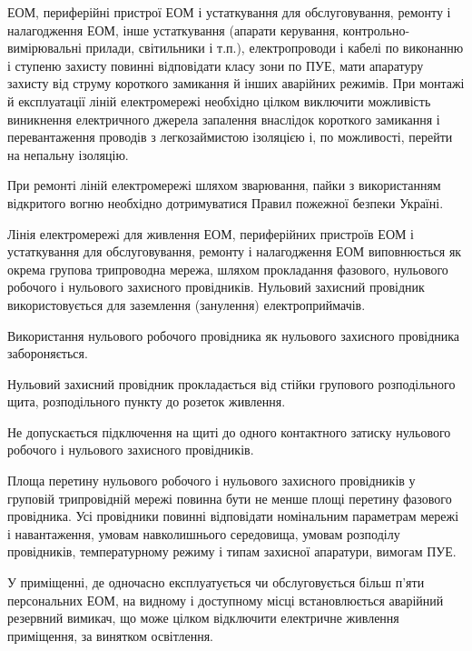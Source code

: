 \documentclass[simple,a4paper,14pt,ukrainian,utf8]{eskdtext}
\begin{document}
\begin{appendices}
                ЕОМ, периферійні пристрої ЕОМ і устаткування для обслуговування, ремонту і налагодження ЕОМ, інше устаткування (апарати керування, контрольно-вимірювальні прилади, світильники і т.п.), електропроводи і кабелі по виконанню і ступеню захисту повинні відповідати класу зони по ПУЕ, мати апаратуру захисту від струму короткого замикання й інших аварійних режимів.
                \linebreak\linebreak
                При монтажі й експлуатації ліній електромережі необхідно цілком виключити можливість виникнення електричного джерела запалення внаслідок короткого замикання і перевантаження проводів з легкозаймистою ізоляцією і, по можливості, перейти на непальну ізоляцію.

                При ремонті ліній електромережі шляхом зварювання, пайки з використанням відкритого вогню необхідно дотримуватися Правил пожежної безпеки Україні.

                Лінія електромережі для живлення ЕОМ, периферійних пристроїв ЕОМ і устаткування для обслуговування, ремонту і налагодження ЕОМ виповнюється як окрема групова трипроводна мережа, шляхом прокладання фазового, нульового робочого і нульового захисного провідників. Нульовий захисний провідник використовується для заземлення (занулення) електроприймачів.

                Використання нульового робочого провідника як нульового захисного провідника забороняється.

                Нульовий захисний провідник прокладається від стійки групового розподільного щита, розподільного пункту до розеток живлення.

                Не допускається підключення на щиті до одного контактного затиску нульового робочого і нульового захисного провідників.

                Площа перетину нульового робочого і нульового захисного провідників у груповій трипровідній мережі повинна бути не менше площі перетину фазового провідника. Усі провідники повинні відповідати номінальним параметрам мережі і навантаження, умовам навколишнього середовища, умовам розподілу провідників, температурному режиму і типам захисної апаратури, вимогам ПУЕ.

                У приміщенні, де одночасно експлуатується чи обслуговується більш п'яти персональних ЕОМ, на видному і доступному місці встановлюється аварійний резервний вимикач, що може цілком відключити електричне живлення приміщення, за винятком освітлення.


\end{appendices}
\end{document}

